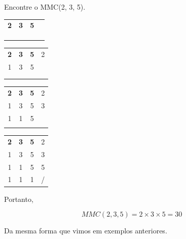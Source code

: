 \begin{exemplo}
    Encontre o MMC(2, 3, 5).

    \begin{table}[H]
    \centering
    \begin{tabular}{ccc|c}
        \textbf{2} & \textbf{3} & \textbf{5} & \\
         &  & \\
         &  & \\
         &  & \\
    \end{tabular}
    \end{table}

    \begin{table}[H]
    \centering
    \begin{tabular}{ccc|c}
        \textbf{2} & \textbf{3} & \textbf{5} & 2\\
        1 & 3 & 5\\
         &  & \\
         &  & \\
    \end{tabular}
    \end{table}
    
    \begin{table}[H]
    \centering
    \begin{tabular}{ccc|c}
        \textbf{2} & \textbf{3} & \textbf{5} & 2\\
        1 & 3 & 5 & 3\\
        1 & 1 & 5 & \\
         &  & \\
    \end{tabular}
    \end{table}

    \begin{table}[H]
    \centering
    \begin{tabular}{ccc|c}
        \textbf{2} & \textbf{3} & \textbf{5} & 2\\
        1 & 3 & 5 & 3\\
        1 & 1 & 5 & 5\\
        1 & 1 & 1 & /\\
    \end{tabular}
    \end{table}

    Portanto, 

    \begin{equation}
        MMC(2,3,5)=2\times3\times5=30
    \end{equation}

    Da mesma forma que vimos em exemplos anteriores.
\end{exemplo}

